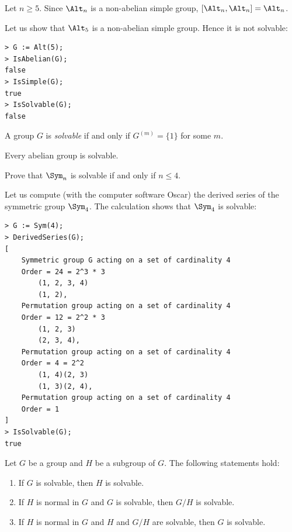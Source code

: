 \begin{example}
    Let $n\geq5$. Since $\Alt_n$ is a non-abelian simple group, 
    $[\Alt_n,\Alt_n]=\Alt_n$. 
\end{example}

Let us show that $\Alt_5$ is a non-abelian simple group. Hence
it is not solvable: 
\begin{lstlisting}
> G := Alt(5);
> IsAbelian(G);
false
> IsSimple(G);
true
> IsSolvable(G);
false
\end{lstlisting}


\begin{definition}
    A group $G$ is \emph{solvable} if and only if
    $G^{(m)}=\{1\}$ for some $m$. 
\end{definition}

Every abelian group is solvable. 

\begin{exercise}
    Prove that $\Sym_n$ is solvable if and only if $n\leq4$. 
\end{exercise}

Let us compute (with the computer software Oscar) 
the derived series of the symmetric group
$\Sym_4$. The calculation shows that $\Sym_4$ is solvable: 
\begin{lstlisting}
> G := Sym(4);
> DerivedSeries(G);
[
    Symmetric group G acting on a set of cardinality 4
    Order = 24 = 2^3 * 3
        (1, 2, 3, 4)
        (1, 2),
    Permutation group acting on a set of cardinality 4
    Order = 12 = 2^2 * 3
        (1, 2, 3)
        (2, 3, 4),
    Permutation group acting on a set of cardinality 4
    Order = 4 = 2^2
        (1, 4)(2, 3)
        (1, 3)(2, 4),
    Permutation group acting on a set of cardinality 4
    Order = 1
]
> IsSolvable(G);
true
\end{lstlisting}


\begin{proposition}
\label{pro:solvable}
    Let $G$ be a group and $H$ be a subgroup of $G$. 
    The following statements hold:
    \begin{enumerate}
        \item If $G$ is solvable, then $H$ is solvable.
        \item If $H$ is normal in $G$ and $G$ is solvable, then $G/H$ is solvable. 
        \item If $H$ is normal in $G$ and $H$ and $G/H$ are solvable, then $G$ is solvable. 
    \end{enumerate}
\end{proposition}

